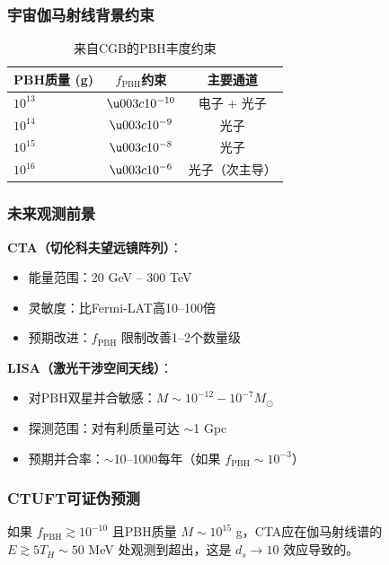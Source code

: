 \subsubsection{宇宙伽马射线背景约束}

\begin{table}[h]
\centering
\caption{来自CGB的PBH丰度约束}
\begin{tabular}{lcc}
\toprule
\textbf{PBH质量 (g)} & \textbf{$f_{\text{PBH}}$约束} & \textbf{主要通道} \\
\midrule
$10^{13}$ & $\u003c 10^{-10}$ & 电子 + 光子 \\
$10^{14}$ & $\u003c 10^{-9}$ & 光子 \\
$10^{15}$ & $\u003c 10^{-8}$ & 光子 \\
$10^{16}$ & $\u003c 10^{-6}$ & 光子（次主导）
\bottomrule
\end{tabular}
\end{table}

\subsubsection{未来观测前景}

\textbf{CTA（切伦科夫望远镜阵列）}：
\begin{itemize}
    \item 能量范围：20 GeV -- 300 TeV
    \item 灵敏度：比Fermi-LAT高10--100倍
    \item 预期改进：$f_{\text{PBH}}$ 限制改善1--2个数量级
\end{itemize}

\textbf{LISA（激光干涉空间天线）}：
\begin{itemize}
    \item 对PBH双星并合敏感：$M \sim 10^{-12} - 10^{-7} M_\odot$
    \item 探测范围：对有利质量可达 $\sim$1 Gpc
    \item 预期并合率：$\sim$10--1000每年（如果 $f_{\text{PBH}} \sim 10^{-3}$）
\end{itemize}

\subsubsection{CTUFT可证伪预测}

\begin{prediction}[高能谱增强]
如果 $f_{\text{PBH}} \gtrsim 10^{-10}$ 且PBH质量 $M \sim 10^{15}$ g，CTA应在伽马射线谱的 $E \gtrsim 5 T_H \sim 50$ MeV 处观测到超出，这是 $d_s \to 10$ 效应导致的。
\end{prediction}

